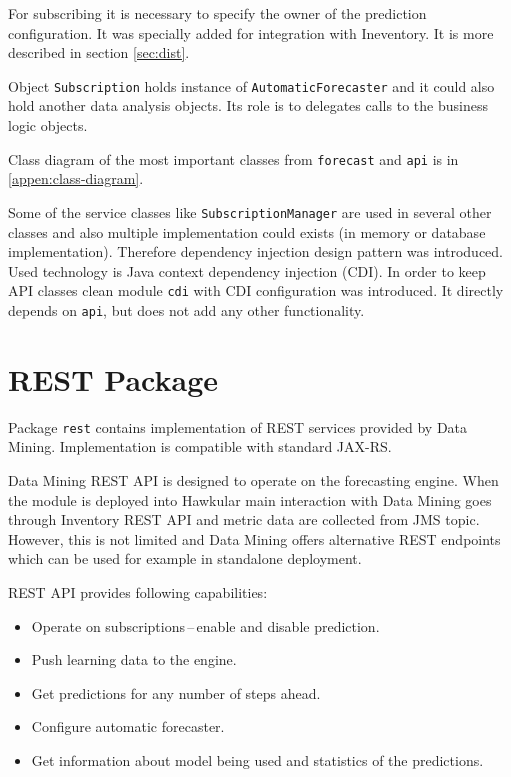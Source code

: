     For subscribing it is necessary to specify the owner of the prediction configuration. It was specially added for
    integration with Ineventory. It is more described in section \ref{sec:dist}.

    Object \texttt{Subscription} holds instance of \texttt{AutomaticForecaster} and it could also hold another
    data analysis objects. Its role is to delegates calls to the business logic objects.

    Class diagram  of the most important classes from \texttt{forecast} and \texttt{api} is in
    \ref{appen:class-diagram}.

    Some of the service classes like \texttt{SubscriptionManager} are used in several other classes and also multiple
    implementation could exists (in memory or database implementation). Therefore dependency injection
    design pattern was introduced. Used technology is Java context dependency injection (CDI). In order to keep
    API classes clean module \texttt{cdi} with CDI configuration was introduced. It directly depends on \texttt{api},
    but does not add any other functionality.

    \section{REST Package}
    Package \texttt{rest} contains implementation of REST services provided by Data Mining. Implementation is
    compatible with standard JAX-RS.

    Data Mining REST API is designed to operate on the forecasting engine. When the module is deployed into Hawkular
    main interaction with Data Mining goes through Inventory REST API and metric data are collected from JMS topic.
    However, this is not limited and Data Mining offers alternative REST endpoints which can be used for
    example in standalone deployment.

    REST API provides following capabilities:

    \begin{itemize}
        \item Operate on subscriptions\,--\,enable and disable prediction.
        \item Push learning data to the engine.
        \item Get predictions for any number of steps ahead.
        \item Configure automatic forecaster.
        \item Get information about model being used and statistics of the predictions.
    \end{itemize}

